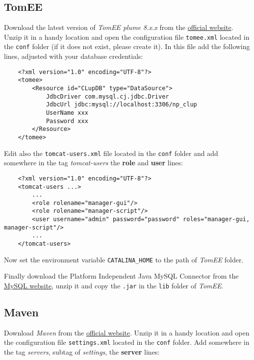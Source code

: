 \subsection{TomEE}
Download the latest version of \textit{TomEE plume 8.x.x} from the \href{https://tomee.apache.org/download-ng.html}{official website}.\newline
Unzip it in a handy location and open the configuration file \verb|tomee.xml| located in the \verb|conf| folder (if it does not exist, please create it).\newline
In this file add the following lines, adjusted with your database credentials:


\begin{lstlisting}
	<?xml version="1.0" encoding="UTF-8"?>
	<tomee>
		<Resource id="CLupDB" type="DataSource">
			JdbcDriver com.mysql.cj.jdbc.Driver
			JdbcUrl jdbc:mysql://localhost:3306/np_clup
			UserName xxx
			Password xxx
		</Resource>
	</tomee>
\end{lstlisting}

Edit also the \verb|tomcat-users.xml| file located in the \verb|conf| folder and add somewhere in the tag \textit{tomcat-users} the \textbf{role} and \textbf{user} lines:

\begin{lstlisting}
	<?xml version="1.0" encoding="UTF-8"?>
	<tomcat-users ...>
		...
		<role rolename="manager-gui"/>
		<role rolename="manager-script"/>
		<user username="admin" password="password" roles="manager-gui, manager-script"/>
		...
	</tomcat-users>
\end{lstlisting}

Now set the environment variable \verb|CATALINA_HOME| to the path of \textit{TomEE} folder.

Finally download the Platform Independent Java MySQL Connector from the \href{https://dev.mysql.com/downloads/connector/j/}{MySQL website}, unzip it and copy the \verb|.jar| in the \verb|lib| folder of \textit{TomEE}.

\subsection{Maven}
Download \textit{Maven} from the \href{https://maven.apache.org/download.cgi}{official website}.\newline
Unzip it in a handy location and open the configuration file \verb|settings.xml| located in the \verb|conf| folder.
Add somewhere in the tag \textit{servers}, subtag of \textit{settings}, the \textbf{server} lines:


